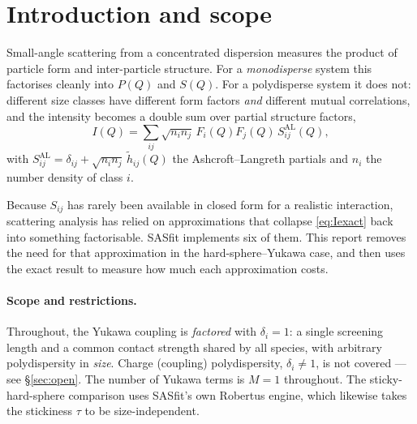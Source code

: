 \documentclass[11pt,a4paper]{article}
\begin{document}
\begin{abstract}
With an exact $S_{ij}$ available, we then quantify --- for the first time, as
far as we are aware --- the error of all six approximate schemes that SASfit
offers for combining a structure factor with a size distribution. Two results
are of practical consequence. First, the ``partial structure factor'' option is
statistically indistinguishable from the decoupling approximation in every case
tested, so the double integral it requires buys nothing. Second, the ranking of
the remaining schemes is \emph{not} universal: the local monodisperse
approximation is the best choice for repulsive interactions, but for attractive
ones the scaling approximation of Gazzillo \emph{et al.} is better by roughly a
factor of four. The common rule of thumb favouring the local monodisperse
approximation is therefore only half right.
\end{abstract}

\tableofcontents

\section{Introduction and scope}

Small-angle scattering from a concentrated dispersion measures the product of
particle form and inter-particle structure. For a \emph{monodisperse} system
this factorises cleanly into $P(Q)$ and $S(Q)$. For a polydisperse system it
does not: different size classes have different form factors \emph{and}
different mutual correlations, and the intensity becomes a double sum over
partial structure factors,
\begin{equation}
  I(Q)=\sum_{ij}\sqrt{n_i n_j}\,F_i(Q)F_j(Q)\,S^{\mathrm{AL}}_{ij}(Q),
  \label{eq:Iexact}
\end{equation}
with $S^{\mathrm{AL}}_{ij}=\delta_{ij}+\sqrt{n_in_j}\,\tilde h_{ij}(Q)$ the
Ashcroft--Langreth partials and $n_i$ the number density of class $i$.

Because $S_{ij}$ has rarely been available in closed form for a realistic
interaction, scattering analysis has relied on approximations that collapse
\eqref{eq:Iexact} back into something factorisable. SASfit implements six of
them. This report removes the need for that approximation in the
hard-sphere--Yukawa case, and then uses the exact result to measure how much
each approximation costs.

\paragraph{Scope and restrictions.} Throughout, the Yukawa coupling is
\emph{factored} with $\delta_i=1$: a single screening length and a common
contact strength shared by all species, with arbitrary polydispersity in
\emph{size}. Charge (coupling) polydispersity, $\delta_i\neq1$, is not covered
--- see \S\ref{sec:open}. The number of Yukawa terms is $M=1$ throughout. The
sticky-hard-sphere comparison uses SASfit's own Robertus engine, which likewise
takes the stickiness $\tau$ to be size-independent.
\end{document}

